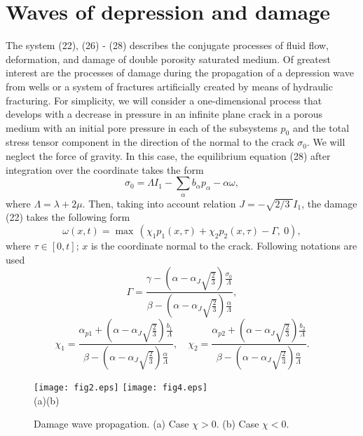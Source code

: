 \documentclass[article,authoryear,jpm]{beg_39}             %
\begin{document}
\section{Waves of depression and damage}
The system (22), (26) - (28) describes the conjugate processes of fluid flow, deformation, and damage of double porosity saturated medium.
Of greatest interest are the processes of damage during the propagation of a depression wave from wells or a system of fractures artificially created by means of hydraulic fracturing.
For simplicity, we will consider a one-dimensional process that develops with a decrease in pressure in an infinite plane crack in a porous medium with an initial pore pressure in each of the subsystems $p_0$ and the total stress tensor component in the direction of the normal to the crack $\sigma_0$.
We will neglect the force of gravity.
In this case, the equilibrium equation (28) after integration over the coordinate takes the form
\begin{equation}
{{\sigma }_{0}}=\Lambda {{I}_{1}}-\sum\limits_{\alpha }{{{b}_{\alpha }}{{p}_{\alpha }}-\alpha \omega },
\end{equation}
where $\Lambda =\lambda +2\mu$.
Then, taking into account relation $J=-\sqrt{{2}/{3}\;}{{I}_{1}}$, the damage (22) takes the following form
\begin{equation}
\omega (x,t)={\mathop{\max }}\,\left( {{\chi }_{1}}{{p}_{1}}(x,\tau )+{{\chi }_{2}}{{p}_{2}}(x,\tau )-\Gamma ,\ 0 \right),
\end{equation}
where $\tau \in [0,t]$; $x$ is the coordinate normal to the crack. Following notations are used
\begin{equation}
\Gamma =\frac{\gamma -\left( \alpha -{{\alpha }_{J}}\sqrt{\frac{2}{3}} \right)\frac{{{\sigma }_{0}}}{\Lambda }}{\beta -\left( \alpha -{{\alpha }_{J}}\sqrt{\frac{2}{3}} \right)\frac{\alpha }{\Lambda }},
\end{equation}
\begin{equation}
 {{\chi }_{1}}=\frac{{{\alpha }_{p1}}+\left( \alpha -{{\alpha }_{J}}\sqrt{\frac{2}{3}} \right)\frac{{{b}_{1}}}{\Lambda }}{\beta -\left( \alpha -{{\alpha }_{J}}\sqrt{\frac{2}{3}} \right)\frac{\alpha}{\Lambda }},\quad {{\chi}_{2}}=\frac{{{\alpha }_{p2}}+\left( \alpha -{{\alpha}_{J}}\sqrt{\frac{2}{3}} \right)\frac{{{b}_{2}}}{\Lambda }}{\beta -\left( \alpha -{{\alpha}_{J}}\sqrt{\frac{2}{3}} \right)\frac{\alpha }{\Lambda}}.
\end{equation}
\begin{figure}[!b]
	\centering
\texttt{[image: fig2.eps]} %
\texttt{[image: fig4.eps]} \\
  (a)\hspace*{220pt}(b)
\caption{Damage wave propagation. (a) Case $\chi>0$. (b)  Case $\chi<0$.}
\label{fig1}
\end{figure}
\end{document}
